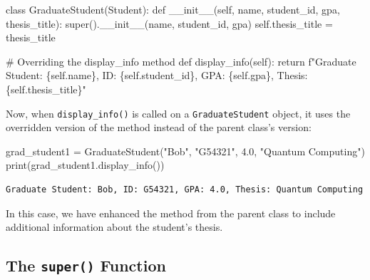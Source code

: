 \documentclass[
  letterpaper,
  DIV=11,
  numbers=noendperiod]{scrreprt}
\newenvironment{Shaded}{\begin{snugshade}}{\end{snugshade}}
\newcommand{\BuiltInTok}[1]{\textcolor[rgb]{0.00,0.23,0.31}{#1}}
\newcommand{\CommentTok}[1]{\textcolor[rgb]{0.37,0.37,0.37}{#1}}
\newcommand{\ControlFlowTok}[1]{\textcolor[rgb]{0.00,0.23,0.31}{#1}}
\newcommand{\FloatTok}[1]{\textcolor[rgb]{0.68,0.00,0.00}{#1}}
\newcommand{\FunctionTok}[1]{\textcolor[rgb]{0.28,0.35,0.67}{#1}}
\newcommand{\KeywordTok}[1]{\textcolor[rgb]{0.00,0.23,0.31}{#1}}
\newcommand{\NormalTok}[1]{\textcolor[rgb]{0.00,0.23,0.31}{#1}}
\newcommand{\OperatorTok}[1]{\textcolor[rgb]{0.37,0.37,0.37}{#1}}
\newcommand{\SpecialCharTok}[1]{\textcolor[rgb]{0.37,0.37,0.37}{#1}}
\newcommand{\SpecialStringTok}[1]{\textcolor[rgb]{0.13,0.47,0.30}{#1}}
\newcommand{\StringTok}[1]{\textcolor[rgb]{0.13,0.47,0.30}{#1}}
\newcommand{\VariableTok}[1]{\textcolor[rgb]{0.07,0.07,0.07}{#1}}
\begin{document}
\begin{Shaded}
\begin{Highlighting}[]
\KeywordTok{class}\NormalTok{ GraduateStudent(Student):}
    \KeywordTok{def} \FunctionTok{\_\_init\_\_}\NormalTok{(}\VariableTok{self}\NormalTok{, name, student\_id, gpa, thesis\_title):}
        \BuiltInTok{super}\NormalTok{().}\FunctionTok{\_\_init\_\_}\NormalTok{(name, student\_id, gpa)}
        \VariableTok{self}\NormalTok{.thesis\_title }\OperatorTok{=}\NormalTok{ thesis\_title}

    \CommentTok{\# Overriding the display\_info method}
    \KeywordTok{def}\NormalTok{ display\_info(}\VariableTok{self}\NormalTok{):}
        \ControlFlowTok{return} \SpecialStringTok{f"Graduate Student: }\SpecialCharTok{\{}\VariableTok{self}\SpecialCharTok{.}\NormalTok{name}\SpecialCharTok{\}}\SpecialStringTok{, ID: }\SpecialCharTok{\{}\VariableTok{self}\SpecialCharTok{.}\NormalTok{student\_id}\SpecialCharTok{\}}\SpecialStringTok{, GPA: }\SpecialCharTok{\{}\VariableTok{self}\SpecialCharTok{.}\NormalTok{gpa}\SpecialCharTok{\}}\SpecialStringTok{, Thesis: }\SpecialCharTok{\{}\VariableTok{self}\SpecialCharTok{.}\NormalTok{thesis\_title}\SpecialCharTok{\}}\SpecialStringTok{"}
\end{Highlighting}
\end{Shaded}

Now, when \texttt{display\_info()} is called on a
\texttt{GraduateStudent} object, it uses the overridden version of the
method instead of the parent class's version:

\begin{Shaded}
\begin{Highlighting}[]
\NormalTok{grad\_student1 }\OperatorTok{=}\NormalTok{ GraduateStudent(}\StringTok{"Bob"}\NormalTok{, }\StringTok{"G54321"}\NormalTok{, }\FloatTok{4.0}\NormalTok{, }\StringTok{"Quantum Computing"}\NormalTok{)}
\BuiltInTok{print}\NormalTok{(grad\_student1.display\_info())  }
\end{Highlighting}
\end{Shaded}

\begin{verbatim}
Graduate Student: Bob, ID: G54321, GPA: 4.0, Thesis: Quantum Computing
\end{verbatim}

In this case, we have enhanced the method from the parent class to
include additional information about the student's thesis.

\hypertarget{the-super-function}{%
\subsection{\texorpdfstring{The \texttt{super()}
Function}{The super() Function}}\label{the-super-function}}
\end{document}
